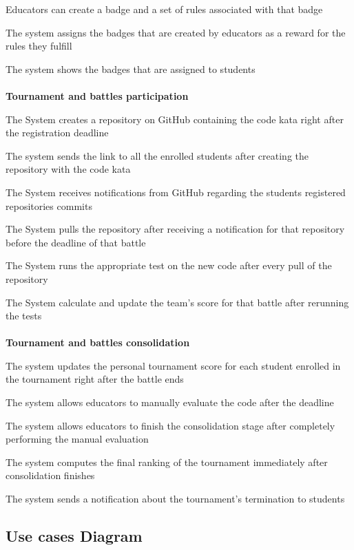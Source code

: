 \begin{enumerate}[label={[R\arabic*]}]
    \item Educators can create a badge and a set of rules associated with that badge
    \item The system assigns the badges that are created by educators as a reward for the rules they fulfill
    \item The system shows the badges that are assigned to students
    \\  \\  \textbf{Tournament and battles participation}
    \item The System creates a repository on GitHub containing the code kata right after the registration deadline
    \item The system sends the link to all the enrolled students after creating the repository with the code kata
    \item The System receives notifications from GitHub regarding the students registered repositories commits
    \item The System pulls the repository after receiving a notification for that repository before the deadline of that battle
    \item The System runs the appropriate test on the new code after every pull of the repository
    \item The System calculate and update the team's score for that battle after rerunning the tests
    \\  \\  \textbf{Tournament and battles consolidation}
    \item The system updates the personal tournament score for each student enrolled in the tournament right after the battle ends
    \item The system allows educators to manually evaluate the code after the deadline
    \item The system  allows educators to finish the consolidation stage after completely performing the manual evaluation
    \item The system computes the final ranking of the tournament immediately after consolidation finishes
    \item The system  sends a notification about the tournament's termination to students 
\end{enumerate}

\subsection{Use cases Diagram}

